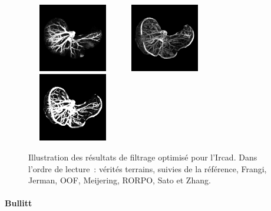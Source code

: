 \begin{figure}[!ht]
  \includegraphics[clip = true, trim  =  10 150 10 150, height=3cm,width=4cm]{Images/Ircad_RORPO.png}
  \includegraphics[clip = true, trim  =  10 150 10 150, height=3cm,width=4cm]{Images/Ircad_Sato.png}
  \includegraphics[clip = true, trim  =  10 150 10 150, height=3cm,width=4cm]{Images/Ircad_Zhang.png}
  \caption{Illustration des résultats de filtrage optimisé pour l'Ircad.
  Dans l'ordre de lecture~: vérités terrains, suivies de la référence, Frangi, Jerman, OOF, Meijering, RORPO, Sato et Zhang.}
  \label{fig:qualitative results Ircad}
\end{figure}

\paragraph{Bullitt}

